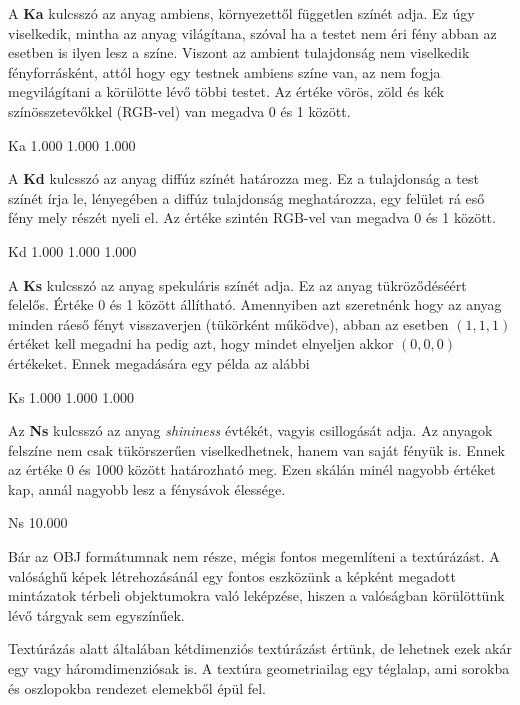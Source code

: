 A \textbf{Ka} kulcsszó az anyag ambiens, környezettől független színét adja. Ez úgy viselkedik, mintha az anyag világítana, szóval ha a testet nem éri fény abban az esetben is ilyen lesz a színe. Viszont  az ambient tulajdonság nem viselkedik fényforrásként, attól hogy egy testnek ambiens színe van, az nem fogja megvilágítani a körülötte lévő többi testet. Az értéke vörös, zöld és kék színösszetevőkkel (RGB-vel) van megadva 0 és 1 között.
\begin{python}
Ka 1.000 1.000 1.000
\end{python}

A \textbf{Kd} kulcsszó az anyag diffúz színét határozza meg. Ez a tulajdonság a test színét írja le, lényegében a diffúz tulajdonság meghatározza, egy felület rá eső fény mely részét nyeli el. Az értéke szintén RGB-vel van megadva 0 és 1 között.
\begin{python}
Kd 1.000 1.000 1.000
\end{python}

A \textbf{Ks} kulcsszó az anyag spekuláris színét adja. Ez az anyag tükröződéséért felelős. Értéke 0 és 1 között állítható. Amennyiben azt szeretnénk hogy az anyag minden ráeső fényt visszaverjen (tükörként működve), abban az esetben $(1, 1, 1)$ értéket kell megadni ha pedig azt, hogy mindet elnyeljen akkor $(0, 0, 0)$ értékeket. Ennek megadására egy példa az alábbi
\begin{python}
Ks 1.000 1.000 1.000
\end{python}

Az \textbf{Ns} kulcsszó az anyag \textit{shininess} évtékét, vagyis csillogását adja. Az anyagok felszíne nem csak tükörszerűen viselkedhetnek, hanem van saját fényük is. Ennek az értéke 0 és 1000 között határozható meg. Ezen skálán minél nagyobb értéket kap, annál nagyobb lesz a fénysávok élessége.\cite{johnmtl}
\begin{python}
Ns 10.000
\end{python}


Bár az OBJ formátumnak nem része, mégis fontos megemlíteni a textúrázást. A valósághű képek létrehozásánál egy fontos eszközünk a képként megadott mintázatok térbeli objektumokra való leképzése, hiszen a valóságban körülöttünk lévő tárgyak sem egyszínűek.

Textúrázás alatt általában kétdimenziós textúrázást értünk, de lehetnek ezek akár egy vagy háromdimenziósak is. A textúra geometriailag egy téglalap, ami sorokba és oszlopokba rendezet elemekből épül fel.

